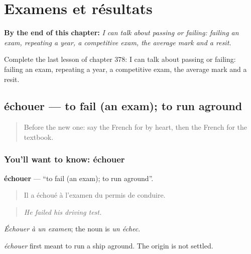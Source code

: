 
\chapter{Examens et résultats}
\label{ch:fr-examens-et-resultats}

\begin{chapteropening}
\textbf{By the end of this chapter:} \emph{I can talk about passing or failing: failing an exam, repeating a year, a competitive exam, the average mark and a resit.}

Complete the last lesson of chapter 378: I can talk about passing or failing: failing an exam, repeating a year, a competitive exam, the average mark and a resit.
\end{chapteropening}

\section[échouer]{échouer — to fail (an exam); to run aground}

\label{lesson:FR-C378-echouer}



\begin{quote}
Before the new one: say the French for by heart, then the French for the textbook.
\end{quote}

\subsection*{You'll want to know: échouer}
\textbf{échouer} — \textquotedblleft{}to fail (an exam); to run aground\textquotedblright{}.

\begin{quote}
Il a échoué à l'examen du permis de conduire.
\end{quote}

\begin{quote}
\emph{He failed his driving test.}
\end{quote}

\emph{Échouer à un examen}; the noun is \emph{un échec}.

\begin{cousinweb}
\emph{échouer} first meant to run a ship aground. The origin is not settled.
\end{cousinweb}

